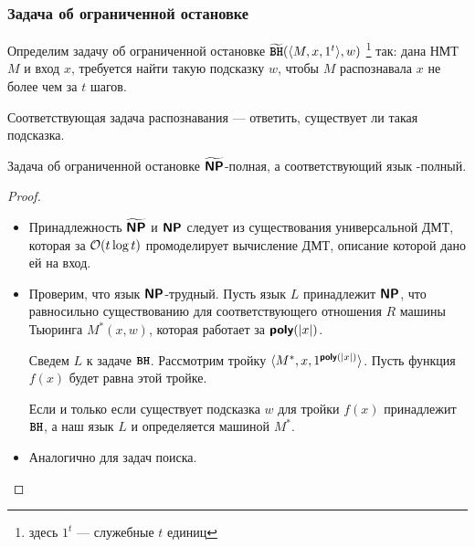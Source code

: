 \subsubsection{Задача об ограниченной остановке}
\begin{defn}[\BH]
	Определим задачу об ограниченной остановке $ \widetilde{{\textbf{\texttt{BH}}}}(\langle M, x, 1^{t} \rangle, w)$ \footnote{здесь $ 1^{t}$ --- служебные $ t$ единиц} так:
	дана НМТ $ M$ и вход $ x$, требуется найти такую подсказку $ w$, чтобы $ M$ распознавала $ x$ не более чем за $ t$ шагов.

	\noindent
	Соответствующая задача распознавания --- ответить, существует ли такая подсказка.
\end{defn}
\begin{thm}
    Задача об ограниченной остановке $ \widetilde{\textmd{\textbf{\textsf{NP}}}}$-полная, а соответствующий язык \NP-полный.
\end{thm}
\begin{proof}
	\begin{itemize}
		\item Принадлежность $ \widetilde{\textmd{\textbf{\textsf{NP}}}}$ и $ \textmd{\textbf{\textsf{NP}}}$ следует из существования универсальной ДМТ, которая за $ \mathcal{O}(t \log t)$ промоделирует вычисление ДМТ, описание которой дано ей на вход.
		\item Проверим, что язык  $ \textmd{\textbf{\textsf{NP}}}$-трудный.
			Пусть  язык $ L$ принадлежит $ \textmd{\textbf{\textsf{NP}}}$, что равносильно существованию для соответствующего отношения $ R$ машины Тьюринга $ M^{*}(x, w)$, которая работает за $ \textmd{\textbf{\textsf{poly}}}(\lvert x \rvert )$.

			Сведем $ L$ к задаче $ {\textbf{\texttt{BH}}}$. Рассмотрим тройку $ \langle M^{*}, x, 1^{\textmd{\textbf{\textsf{poly}}}(\lvert x \rvert )} \rangle$. 
			Пусть функция $ f(x)$ будет равна этой тройке.

			Если и только если существует подсказка $ w$ для тройки $ f(x) $ принадлежит $ {\textbf{\texttt{BH}}}$, а наш язык $ L$ и определяется машиной $ M^{*}$. 
		\item Аналогично для задач поиска.
    \end{itemize}
\end{proof}

